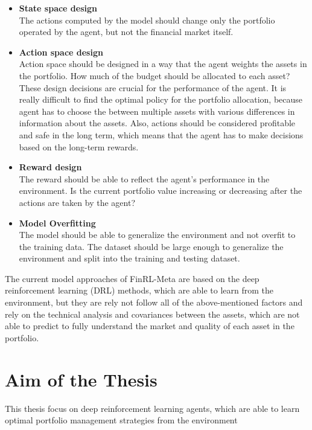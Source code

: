 \begin{itemize}
    \item \textbf{State space design}\\
    The actions computed by the model should change only the portfolio operated
    by the agent, but not the financial market itself.
    \item \textbf{Action space design } \\
    Action space should be designed in a way that the agent weights the
    assets in the portfolio.
    How much of the budget should be allocated to
    each asset?
    These design decisions are crucial for the performance of the agent.
    It is really difficult to find the optimal policy for the portfolio allocation,
    because agent has to choose the between multiple assets with
    various differences in information about the assets.
    Also, actions should be considered profitable and safe in the long term,
    which means that the
    agent has to make decisions based on the long-term rewards.
    \item \textbf{Reward design}\\
    The reward should be able to reflect the agent's performance in the
    environment.
    Is the current portfolio value increasing or decreasing after
    the actions are taken by the agent?
    \item \textbf{Model Overfitting}\\
    The model should be able to generalize the environment and not overfit
    to the training data.
    The dataset should be large enough to generalize
    the environment and split into the training and testing dataset.
\end{itemize}

The current model approaches of FinRL-Meta are based on the deep reinforcement
learning (DRL) methods, which are able to learn from the environment, but
they are rely not follow all of the above-mentioned factors and rely on the
technical analysis and covariances between the assets, which
are not able to predict to fully understand the market and
quality of each asset in the portfolio.


\section{Aim of the Thesis}\label{sec:aim-of-the-thesis}

This thesis focus on deep reinforcement learning agents, which are able to
learn optimal portfolio management strategies from the environment

